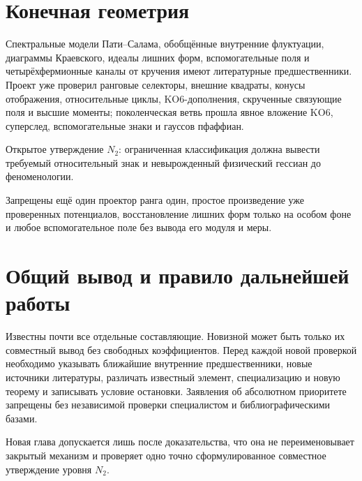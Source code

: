 \section{Конечная геометрия}

Спектральные модели Пати--Салама, обобщённые внутренние флуктуации,
диаграммы Краевского, идеалы лишних форм, вспомогательные поля и
четырёхфермионные каналы от кручения имеют литературные предшественники.
Проект уже проверил ранговые селекторы, внешние квадраты, конусы отображения,
относительные циклы, KO6-дополнения, скрученные связующие поля и высшие
моменты; поколенческая ветвь прошла явное вложение KO6, суперслед,
вспомогательные знаки и гауссов пфаффиан.

Открытое утверждение \(N_2\): ограниченная классификация должна вывести
требуемый относительный знак и невырожденный физический гессиан до
феноменологии.

\begin{nogocriterion}
Запрещены ещё один проектор ранга один, простое произведение уже проверенных
потенциалов, восстановление лишних форм только на особом фоне и любое
вспомогательное поле без вывода его модуля и меры.
\end{nogocriterion}

\section{Общий вывод и правило дальнейшей работы}

Известны почти все отдельные составляющие. Новизной может быть только их
совместный вывод без свободных коэффициентов. Перед каждой новой проверкой
необходимо указывать ближайшие внутренние предшественники, новые источники
литературы, различать известный элемент, специализацию и новую теорему и
записывать условие остановки. Заявления об абсолютном приоритете запрещены
без независимой проверки специалистом и библиографическими базами.

\begin{protocol}
Новая глава допускается лишь после доказательства, что она не переименовывает
закрытый механизм и проверяет одно точно сформулированное совместное
утверждение уровня \(N_2\).
\end{protocol}